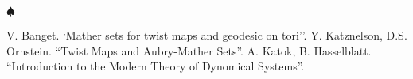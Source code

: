\documentclass{article}
\begin{document}
	\noindent $\spadesuit$
\color{black}


		







\newpage		
\begin{thebibliography}{X}

 V. Banget. `Mather sets for twist maps and geodesic on tori''.
 Y. Katznelson, D.S. Ornstein. ``Twist Maps and Aubry-Mather Sets''.
 A. Katok, B. Hasselblatt. ``Introduction to the Modern Theory of Dynomical Systems''.

\end{thebibliography}
		
		
		
		
		
		
		
		
		
		
		
		

	
	
\end{document}
